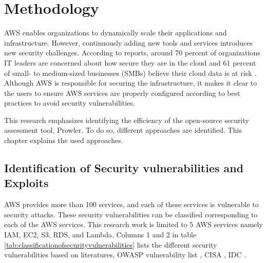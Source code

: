 
\chapter{Methodology}

\par AWS enables organizations to dynamically scale their applications and infrastructure.
However, continuously adding new tools and services introduces new security challenges.
According to reports, around 70 percent of organizations IT leaders are concerned about how secure they are in the cloud and 61 percent of small- to medium-sized businesses (SMBs) believe their cloud data is at risk \cite{65}. Although AWS is responsible for securing the infrastructure, it makes it clear to the users to ensure AWS services are properly configured according to best practices to avoid security vulnerabilities.

\par This research emphasizes identifying the efficiency of the open-source security assessment tool, Prowler.
To do so, different approaches are identified. This chapter explains the used approaches.


\section{Identification of Security vulnerabilities and Exploits}

\par AWS provides more than 100 services, and each of these services is vulnerable to security attacks.
These security vulnerabilities can be classified corresponding to each of the AWS services.
This research work is limited to 5 AWS services namely IAM, EC2, S3, RDS, and Lambda.
Columns 1 and 2 in table \ref{tab:classificationofsecurityvulnerabilities} lists the different security
vulnerabilities based on literatures, OWASP vulnerability list \cite{43}, CISA \cite{42}, IDC \cite{41}.

